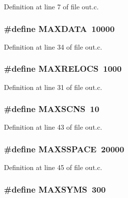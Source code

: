 Definition at line 7 of file out.\+c.

\subsubsection[{M\+A\+X\+D\+A\+TA}]{\setlength{\rightskip}{0pt plus 5cm}\#define M\+A\+X\+D\+A\+TA~10000}\label{out_8c_ae7e715c270481406658bbd2bafa2897f}


Definition at line 34 of file out.\+c.

\subsubsection[{M\+A\+X\+R\+E\+L\+O\+CS}]{\setlength{\rightskip}{0pt plus 5cm}\#define M\+A\+X\+R\+E\+L\+O\+CS~1000}\label{out_8c_a926b405638c6ec47d673824649b826df}


Definition at line 31 of file out.\+c.

\subsubsection[{M\+A\+X\+S\+C\+NS}]{\setlength{\rightskip}{0pt plus 5cm}\#define M\+A\+X\+S\+C\+NS~10}\label{out_8c_a5b755fa4590b197a11b1ffc07e5d3987}


Definition at line 43 of file out.\+c.

\subsubsection[{M\+A\+X\+S\+S\+P\+A\+CE}]{\setlength{\rightskip}{0pt plus 5cm}\#define M\+A\+X\+S\+S\+P\+A\+CE~20000}\label{out_8c_aba35211207b9c0553e9f96f95a12c91a}


Definition at line 45 of file out.\+c.

\subsubsection[{M\+A\+X\+S\+Y\+MS}]{\setlength{\rightskip}{0pt plus 5cm}\#define M\+A\+X\+S\+Y\+MS~300}\label{out_8c_a8390bee79d08f80714582166875688d9}



